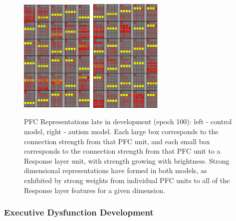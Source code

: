 \documentclass[man]{apa}
\begin{document}
\begin{figure}[th]
\begin{center}
	\includegraphics[width=35mm,height=55mm]{graphs/PFCwts1.100.eps}
	\hspace{18 mm}
	\includegraphics[width=35mm,height=55mm]{graphs/PFCwts54.100.eps}
\end{center}
\caption{PFC Representations late in development
         (epoch 100): left - control model, right -
         autism model.  Each large box corresponds to the connection strength from that PFC unit, and each small box corresponds to the connection strength from that PFC unit to a Response layer unit, with strength growing with brightness.  Strong dimensional representations have formed
         in both models, as exhibited by strong weights from individual PFC units to all of the Response layer features for a given dimension.}  
\label{rep2-figure}
\end{figure} 


\subsubsection{Executive Dysfunction Development} 
\end{document}
